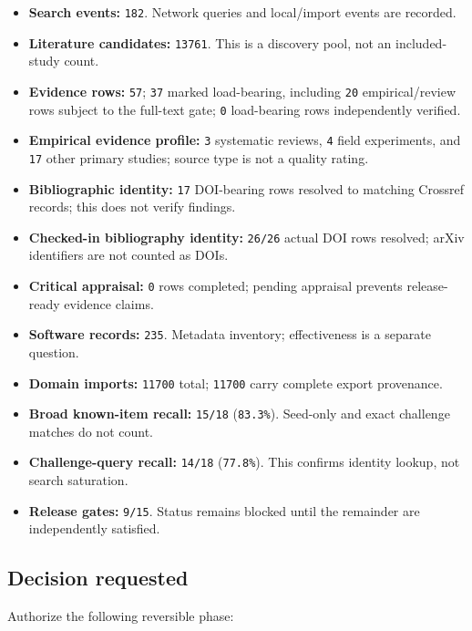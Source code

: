 \documentclass[11pt]{article}
\providecommand{\tightlist}{\setlength{\itemsep}{0pt}\setlength{\parskip}{0pt}}
\begin{document}
\begin{itemize}
\tightlist
\item
  \textbf{Search events:} \texttt{182}. Network queries and local/import events are recorded.
\item
  \textbf{Literature candidates:} \texttt{13761}. This is a discovery pool, not an included-study count.
\item
  \textbf{Evidence rows:} \texttt{57}; \texttt{37} marked load-bearing, including \texttt{20} empirical/review rows subject to the full-text gate; \texttt{0} load-bearing rows independently verified.
\item
  \textbf{Empirical evidence profile:} \texttt{3} systematic reviews, \texttt{4} field experiments, and \texttt{17} other primary studies; source type is not a quality rating.
\item
  \textbf{Bibliographic identity:} \texttt{17} DOI-bearing rows resolved to matching Crossref records; this does not verify findings.
\item
  \textbf{Checked-in bibliography identity:} \texttt{26/26} actual DOI rows resolved; arXiv identifiers are not counted as DOIs.
\item
  \textbf{Critical appraisal:} \texttt{0} rows completed; pending appraisal prevents release-ready evidence claims.
\item
  \textbf{Software records:} \texttt{235}. Metadata inventory; effectiveness is a separate question.
\item
  \textbf{Domain imports:} \texttt{11700} total; \texttt{11700} carry complete export provenance.
\item
  \textbf{Broad known-item recall:} \texttt{15/18} (\texttt{83.3\%}). Seed-only and exact challenge matches do not count.
\item
  \textbf{Challenge-query recall:} \texttt{14/18} (\texttt{77.8\%}). This confirms identity lookup, not search saturation.
\item
  \textbf{Release gates:} \texttt{9/15}. Status remains blocked until the remainder are independently satisfied.
\end{itemize}

\hypertarget{decision-requested}{%
\subsection{Decision requested}\label{decision-requested}}

Authorize the following reversible phase:
\end{document}
